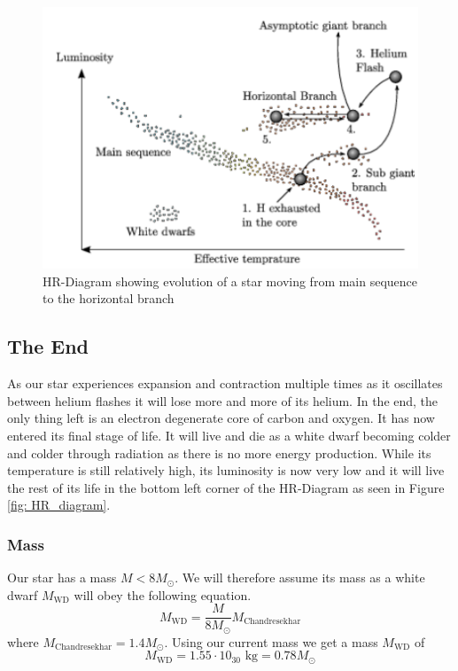 \documentclass[reprint,english,notitlepage]{revtex4-2}
\begin{document}
\begin{figure}[h!]
  \centering
  \includegraphics[scale = .5]{figures/horizontal_branch.png}
  \caption{HR-Diagram showing evolution of a star moving from main sequence to the horizontal branch}
  \label{fig: Main to giant}
\end{figure}  

\subsection{The End}
As our star experiences expansion and contraction multiple times as it oscillates between helium flashes it will lose more and more of its helium. In the end, the only thing left is an electron degenerate core of carbon and oxygen. It has now entered its final stage of life. It will live and die as a white dwarf becoming colder and colder through radiation as there is no more energy production. While its temperature is still relatively high, its luminosity is now very low and it will live the rest of its life in the bottom left corner of the HR-Diagram as seen in Figure \ref{fig: HR_diagram}. 

\subsubsection*{Mass}
Our star has a mass $ M < 8M_{⊙} $. We will therefore assume its mass as a white dwarf $ M_{\text{WD}} $ will obey the following equation. 
\begin{equation}\label{eq: Dwarf mass }
  M_{\text{WD}} = \frac{M}{8M_{⊙}} M_{\text{Chandresekhar}}
\end{equation}   
where $ M_{\text{Chandresekhar}} = 1.4 M_{⊙} $. 
Using our current mass we get a mass $ M_{\text{WD}} $ of
\begin{equation}\label{eq: Dwarf mass calculated }
  M_{\text{WD}} = 1.55 ⋅ 10_{30} \text{ kg} = 0.78 M_{⊙}
\end{equation}
\end{document}
